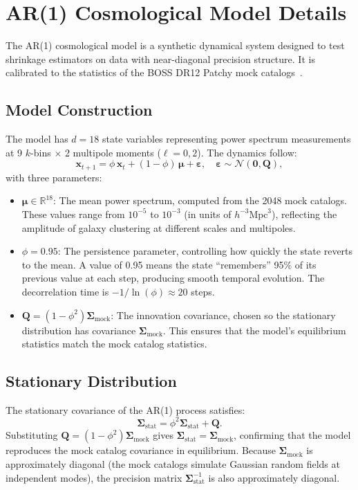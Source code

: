 \chapter{AR(1) Cosmological Model Details}
\label{app:ar1}

The AR(1) cosmological model is a synthetic dynamical system designed to test shrinkage estimators on data with near-diagonal precision structure. It is calibrated to the statistics of the BOSS DR12 Patchy mock catalogs~\citep{looijmans2024comparison}.

\section{Model Construction}

The model has $d = 18$ state variables representing power spectrum measurements at 9 $k$-bins $\times$ 2 multipole moments ($\ell = 0, 2$). The dynamics follow:
\begin{equation}
\mathbf{x}_{t+1} = \phi \, \mathbf{x}_t + (1 - \phi) \, \boldsymbol{\mu} + \boldsymbol{\varepsilon}, \quad \boldsymbol{\varepsilon} \sim \mathcal{N}(\mathbf{0}, \mathbf{Q}),
\end{equation}
with three parameters:
\begin{itemize}
\item $\boldsymbol{\mu} \in \mathbb{R}^{18}$: The mean power spectrum, computed from the 2048 mock catalogs. These values range from $10^{-5}$ to $10^{-3}$ (in units of $h^{-3}\text{Mpc}^3$), reflecting the amplitude of galaxy clustering at different scales and multipoles.
\item $\phi = 0.95$: The persistence parameter, controlling how quickly the state reverts to the mean. A value of 0.95 means the state ``remembers'' 95\% of its previous value at each step, producing smooth temporal evolution. The decorrelation time is $-1/\ln(\phi) \approx 20$ steps.
\item $\mathbf{Q} = (1 - \phi^2) \boldsymbol{\Sigma}_{\text{mock}}$: The innovation covariance, chosen so the stationary distribution has covariance $\boldsymbol{\Sigma}_{\text{mock}}$. This ensures that the model's equilibrium statistics match the mock catalog statistics.
\end{itemize}

\section{Stationary Distribution}

The stationary covariance of the AR(1) process satisfies:
\begin{equation}
\boldsymbol{\Sigma}_{\text{stat}} = \phi^2 \boldsymbol{\Sigma}_{\text{stat}} + \mathbf{Q}.
\end{equation}
Substituting $\mathbf{Q} = (1 - \phi^2)\boldsymbol{\Sigma}_{\text{mock}}$ gives $\boldsymbol{\Sigma}_{\text{stat}} = \boldsymbol{\Sigma}_{\text{mock}}$, confirming that the model reproduces the mock catalog covariance in equilibrium. Because $\boldsymbol{\Sigma}_{\text{mock}}$ is approximately diagonal (the mock catalogs simulate Gaussian random fields at independent modes), the precision matrix $\boldsymbol{\Sigma}_{\text{stat}}^{-1}$ is also approximately diagonal.

